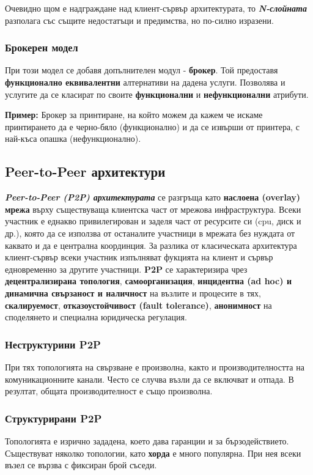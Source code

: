 \documentclass[fleqn,12pt]{article}
\begin{document}
Очевидно щом е надграждане над клиент-сървър архитектурата, то \textbf{\textit{N-слойната}} разполага със същите недостатъци и предимства, но по-силно изразени.

\subsubsection{Брокерен модел}
При този модел се добавя допълнителен модул - \textbf{брокер}.
Той предоставя \textbf{функционално еквивалентни} алтернативи на дадена услуги. 
Позволява и услугите да се класират по своите \textbf{функционални} и \textbf{нефункционални} атрибути.

\textbf{Пример: } Брокер за принтиране, на който можем да кажем че искаме принтирането да е черно-бяло (функционално) 
и да се извърши от принтера, с най-къса опашка (нефункционално).

\subsection{Peer-to-Peer архитектури}

\textbf{\textit{Peer-to-Peer (P2P) архитектурата}} се разгръща като \textbf{наслоена (overlay) мрежа} върху съществуваща клиентска част от мрежова инфраструктура.
Всеки участник е еднакво привилегирован и заделя част от ресурсите си (cpu, диск и др.), която да се използва от останалите участници в мрежата без нуждата от каквато и да е централна координция.
За разлика от класическата архитектура клиент-сървър всеки участник изпълняват фукцията на клиент и сървър едновременно за другите участници.
\textbf{P2P} се характеризира чрез \textbf{децентрализирана топология}, \textbf{самоорганизация}, \textbf{инцидентна (ad hoc) и динамична свързаност и наличност} на възлите и процесите в тях, 
\textbf{скалируемост}, \textbf{отказоустойчивост (fault tolerance)}, 
\textbf{анонимност} на споделянето и специална юридическа регулация.

\subsubsection{Неструктурини P2P}
При тях топологията на свързване е произволна, както и производителността на комуникационните канали.
Често се случва възли да се включват и отпада. В резултат, общата производителност е също произволна.

\subsubsection{Структурирани P2P}
Топологията е изрично зададена, което дава гаранции и за бързодействието. Съществуват 
няколко топологии, като \textbf{хорда} е много популярна. При нея всеки възел се вързва с фиксиран брой съседи.
\end{document}
